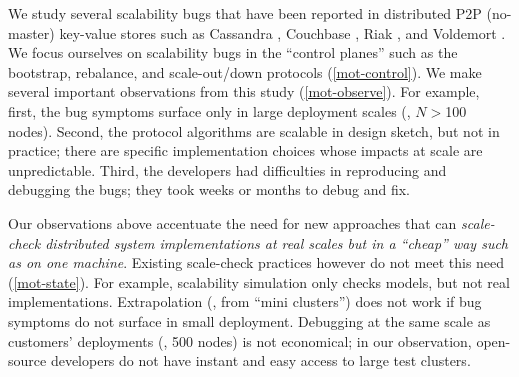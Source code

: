We study several scalability bugs that have been reported in distributed
P2P (no-master) key-value stores such as Cassandra
\cite{Lakshman+09-Cassandra}, Couchbase \cite{CouchbaseWeb}, Riak
\cite{RiakWeb}, and Voldemort \cite{VoldemortWeb}.  We focus ourselves on
scalability bugs in the ``control planes'' such as the bootstrap,
rebalance, and scale-out/down protocols (\sec\ref{mot-control}).  We make
several important observations from this study (\sec\ref{mot-observe}).
%
For example, first, the bug symptoms surface only in large deployment
scales (\eg, $N$$>$100 nodes).
%
Second, the protocol algorithms are scalable in design sketch, but not in
practice; there are specific implementation choices whose impacts at scale
are unpredictable.
%
Third, the developers had difficulties in reproducing and debugging the
bugs; they took weeks or months to debug and fix.



Our observations above accentuate the need for new approaches that can
{\em scale-check distributed system implementations at real scales but in
  a ``cheap'' way such as on one machine}.  Existing scale-check practices
however do not meet this need (\sec\ref{mot-state}).  For example,
scalability simulation only checks models, but not real implementations.
Extrapolation (\eg, from ``mini clusters'') does not work if bug symptoms
do not surface in small deployment.
%
Debugging at the same scale as customers' deployments (\eg, 500 nodes) is
not economical; in our observation, open-source developers do not have
instant and easy access to large test clusters.


%
